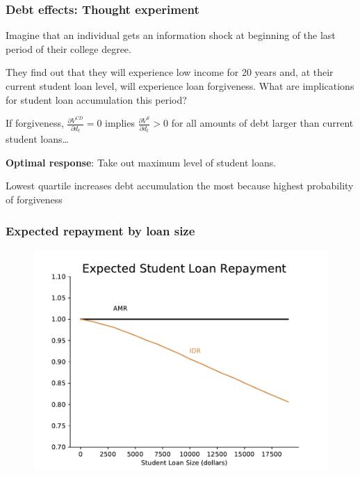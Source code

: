 \documentclass[10pt]{beamer}
\begin{document}
  \begin{frame} \frametitle{Debt effects: Thought experiment}

    Imagine that an individual gets an information shock at beginning of the last period of their
    college degree.

    \vspace{0.1cm}

    They find out that they will experience low income for 20 years and, at their current student
    loan level, will experience loan forgiveness. What are implications for student loan
    accumulation this period?

    \vspace{0.1cm}

    If forgiveness, $\frac{\partial V^{CD}}{\partial d_t} = 0$ implies
    $\frac{\partial V^{S}}{\partial d_t} > 0$ for all amounts of debt larger than current student
    loans\dots

    \textbf{Optimal response}: Take out maximum level of student loans.

    \vspace{0.3cm}

    Lowest quartile increases debt accumulation the most because highest probability of forgiveness

  \end{frame}

  \begin{frame} \frametitle{Expected repayment by loan size}

    \begin{figure}
      \begin{center}
       \includegraphics[width=\textwidth]{../ms/images/StudentLoans/expected_repayment.pdf}
      \end{center}
    \end{figure}

  \end{frame}
\end{document}
